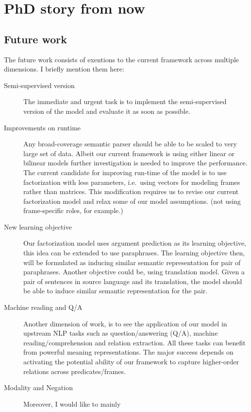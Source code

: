 \chapter{PhD story from now}



\section{Future work}
\label{sec:fwork}

The future work consists of exentions to the current framework across multiple
dimensions. I briefly mention them here:

\begin{description}
  \item[Semi-supervised version] The immediate and urgent task is to implement the semi-supervised
version of the model and evaluate it as soon as possible.
  \item[Improvements on runtime] Any broad-coverage semantic parser
should be able to be scaled to very large set of data. Albeit our current
framework is using either linear or bilinear models further investigation is
needed to improve the performance. The current candidate
for improving run-time of the model is to use factorization with less parameters, i.e.\ using vectors for modeling frames rather than matrices. This modification requires us to
revise our current factorization model and relax some of our model assumptions.
(not using frame-specific roles, for example.)
  \item[New learning objective] Our factorization model uses argument
  prediction as its learning objective, this idea can be extended to use
  paraphrases. The learning objective then, will be formulated as inducing
  similar semantic representation for pair of paraphrases. Another objective
  could be, using translation model. Given a pair of sentences in source
  language and its translation, the model should be able to induce similar
  semantic representation for the pair.
  \item[Machine reading and Q/A] Another dimension of work, is to see the
  application of our model in upstream NLP tasks such as question/answering
  (Q/A), machine reading/comprehension and relation extraction. All these tasks
  can benefit from powerful meaning representations. The major success depends
  on activating the potential ability of our framework to capture higher-order relations across predicates/frames.
  \item[Modality and Negation] Moreover, I would like to mainly

\end{description}
